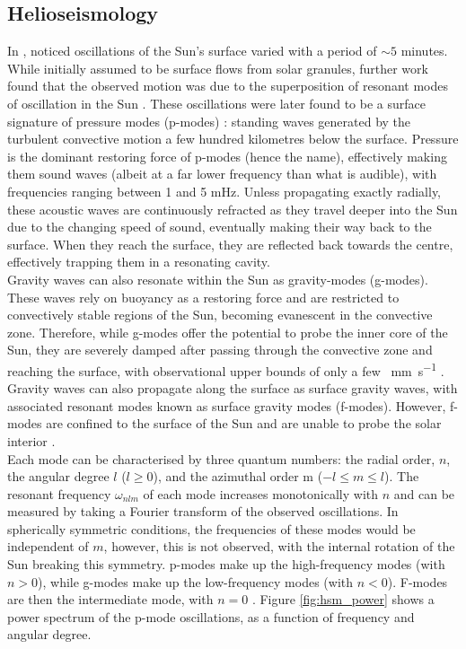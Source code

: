 \documentclass[11pt,a4paper,onecolumn]{report}
\begin{document}
%
\subsection{Helioseismology}
%
\label{sec:HSM}

In \citeyear{leighton_velocity_1962}, \citeauthor{leighton_velocity_1962}
noticed oscillations of the Sun's surface varied with a period of \(\sim
5\) minutes. While initially assumed to be surface flows from solar granules,
further work found that the observed motion was due to the superposition of
resonant modes of oscillation in the Sun \citep{ulrich_five-minute_1970}. These
oscillations were later found to be a surface signature of pressure modes
(p-modes) \citep{deubner_observations_1975}: standing waves generated by the
turbulent convective motion a few hundred kilometres below the surface. Pressure
is the dominant restoring force of p-modes (hence the name), effectively making
them sound waves (albeit at a far lower frequency than what is audible), with
frequencies ranging between 1 and 5 mHz. Unless propagating exactly radially,
these acoustic waves are continuously refracted as they travel deeper into the
Sun due to the changing speed of sound, eventually making their way back to the
surface. When they reach the surface, they are reflected back towards the
centre, effectively trapping them in a resonating cavity. \\

Gravity waves can also resonate within the Sun as gravity-modes (g-modes). These
waves rely on buoyancy as a restoring force and are restricted to convectively
stable regions of the Sun, becoming evanescent in the convective zone.
Therefore, while g-modes offer the potential to probe the inner core of the Sun,
they are severely damped after passing through the convective zone and reaching
the surface, with observational upper bounds of only a few \SI{}{mm.s^{-1}}
\citep{appourchaux_quest_2010}. Gravity waves can also propagate along the
surface as surface gravity waves, with associated resonant modes known as
surface gravity modes (f-modes). However, f-modes are confined to the surface of
the Sun and are unable to probe the solar interior \citep{basu_global_2016}.\\

Each mode can be characterised by three quantum numbers: the radial order,
\(n\), the angular degree \(l\) (\(l \geq 0\)), and the azimuthal order m (\(-l
\leq m \leq l\)). The resonant frequency \(\omega_{nlm}\) of each mode increases
monotonically with \(n\) and can be measured by taking a Fourier transform of
the observed oscillations. In spherically symmetric conditions, the frequencies
of these modes would be independent of \(m\), however, this is not observed,
with the internal rotation of the Sun breaking this symmetry. p-modes make up
the high-frequency modes (with \(n>0\)), while g-modes make up the low-frequency
modes (with \(n<0\)). F-modes are then the intermediate mode, with \(n=0\)
\citep{thompson_helioseismology_2004}. Figure \ref{fig:hsm_power} shows a power
spectrum of the p-mode oscillations, as a function of frequency and angular
degree. \\
\end{document}
